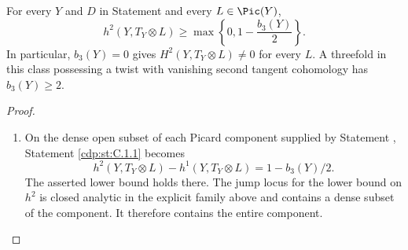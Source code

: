 \begin{proposition}\hypertarget{tag-01BP}{}\label{cdp:st:C.1.3}

For every $Y$ and $D$ in Statement  and every $L\in\Pic(Y)$,
\[
 h^2(Y,T_Y\otimes L)\geq
 \max\left\{0,1-\frac{b_3(Y)}2\right\}.
\]
In particular, $b_3(Y)=0$ gives $H^2(Y,T_Y\otimes L)\ne0$ for
every $L$. A threefold in this class possessing a twist with vanishing
second tangent cohomology has $b_3(Y)\geq2$.
\end{proposition}


\begin{proof}
\begin{enumerate}[label={$\langle1\rangle$\arabic*.},leftmargin=*]
\item 
On the dense open subset of each Picard component supplied by
Statement , Statement \ref{cdp:st:C.1.1} becomes
\[
 h^2(Y,T_Y\otimes L)-h^1(Y,T_Y\otimes L)
 =1-b_3(Y)/2.
\]
The asserted lower bound holds there. The jump locus for the lower
bound on $h^2$ is closed analytic in the explicit family above and
contains a dense subset of the component. It therefore contains the
entire component. 

\end{enumerate}
\end{proof}